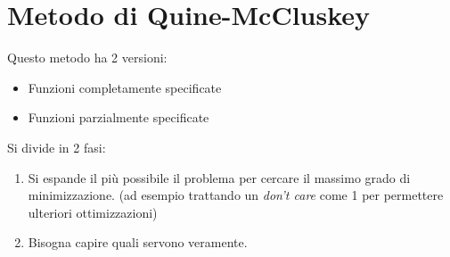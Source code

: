 \documentclass[a4paper]{article}
\theoremstyle{break}
\theoremstyle{break}
\theoremstyle{break}
\theoremstyle{break}
\begin{document}
\section{Metodo di Quine-McCluskey}
Questo metodo ha 2 versioni:
\begin{itemize}
    \item Funzioni completamente specificate
        \item Funzioni parzialmente specificate
\end{itemize}
Si divide in 2 fasi:
\begin{enumerate}
\item Si espande il più possibile il problema per cercare il massimo grado di minimizzazione.
    (ad esempio trattando un \emph{don't care} come 1 per permettere ulteriori ottimizzazioni)
    \item Bisogna capire quali servono veramente.
\end{enumerate}
\end{document}
